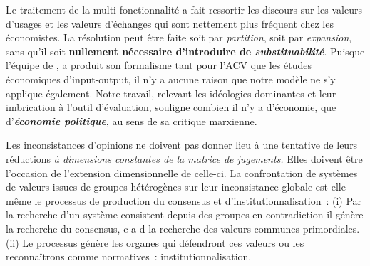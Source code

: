 Le traitement de la multi-fonctionnalité a fait ressortir les discours sur les valeurs d'usages et les valeurs d'échanges qui sont nettement plus fréquent chez les économistes.
La résolution peut être faite soit par \emph{partition}, soit par \emph{expansion}, sans qu'il soit \textbf{nullement nécessaire d'introduire de \emph{substituabilité}}.
Puisque l'équipe de \citeauthor{majeau-bettez_unified_2014}, a produit son formalisme tant pour l'ACV que les études économiques d'input-output, il n'y a aucune raison que notre modèle ne s'y applique également.
Notre travail, relevant les idéologies dominantes et leur imbrication à l'outil d'évaluation, souligne combien il n'y a d'économie, que d'\emph{\textbf{économie politique}}, au sens de sa critique marxienne. %

Les inconsistances d'opinions ne doivent pas donner lieu à une tentative de leurs réductions \emph{à dimensions constantes de la matrice de jugements.}
Elles doivent être l'occasion de l'extension dimensionnelle de celle-ci.
La confrontation de systèmes de valeurs issues de groupes hétérogènes sur leur inconsistance globale est elle-même le processus de production du consensus et d'institutionnalisation~:
(i) Par la recherche d'un système consistent depuis des groupes en contradiction il génère la recherche du consensus, c-a-d la recherche des valeurs communes primordiales.
(ii) Le processus génère les organes qui défendront ces valeurs ou les reconnaîtrons comme normatives~: institutionnalisation.


